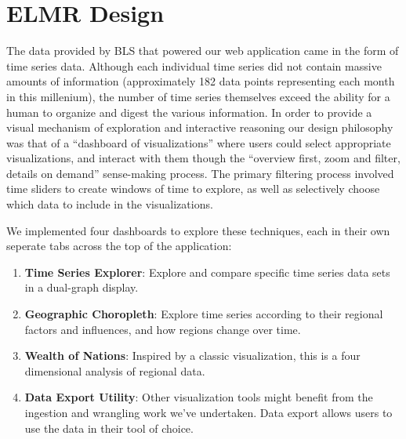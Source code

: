 \documentclass{sigchi}
\newcommand\Ben[1]{{\color{blue}#1}}	%
\begin{document}
\Ben{\section{ELMR Design}

The data provided by BLS that powered our web application came in the form of time series data. Although each individual time series did not contain massive amounts of information (approximately 182 data points representing each month in this millenium), the number of time series themselves exceed the ability for a human to organize and digest the various information. In order to provide a visual mechanism of exploration and interactive reasoning our design philosophy was that of a ``dashboard of visualizations'' where users could select appropriate visualizations, and interact with them though the ``overview first, zoom and filter, details on demand'' sense-making process. The primary filtering process involved time sliders to create windows of time to explore, as well as selectively choose which data to include in the visualizations.

We implemented four dashboards to explore these techniques, each in their own seperate tabs across the top of the application:

\begin{enumerate}
    \item \textbf{Time Series Explorer}: Explore and compare specific time series data sets in a dual-graph display.
    \item \textbf{Geographic Choropleth}: Explore time series according to their regional factors and influences, and how regions change over time.
    \item \textbf{Wealth of Nations}: Inspired by a classic visualization, this is a four dimensional analysis of regional data.
    \item \textbf{Data Export Utility}: Other visualization tools might benefit from the ingestion and wrangling work we've undertaken. Data export allows users to use the data in their tool of choice.
\end{enumerate}

}
\end{document}
